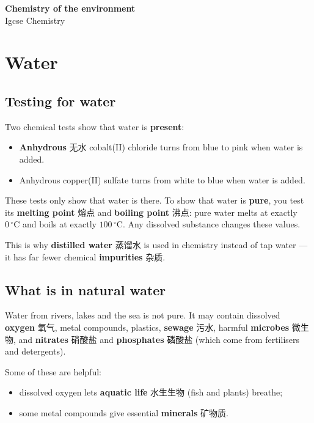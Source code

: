 \documentclass[11pt]{article}
\begin{document}
\begin{center}
  {\LARGE\bfseries Chemistry of the environment}\\[0.35em]
  {\large Igcse Chemistry}
\end{center}
\vspace{0.6em}

\section*{Water}

\subsection*{Testing for water}

Two chemical tests show that water is \textbf{present}:

\begin{itemize}
\item \textbf{Anhydrous} 无水 cobalt(II) chloride turns from blue to pink when water is added.

\item Anhydrous copper(II) sulfate turns from white to blue when water is added.

\end{itemize}

These tests only show that water is there. To show that water is \textbf{pure}, you test its \textbf{melting point} 熔点 and \textbf{boiling point} 沸点: pure water melts at exactly $0\,^{\circ}\text{C}$ and boils at exactly $100\,^{\circ}\text{C}$. Any dissolved substance changes these values.

This is why \textbf{distilled water} 蒸馏水 is used in chemistry instead of tap water — it has far fewer chemical \textbf{impurities} 杂质.

\subsection*{What is in natural water}

Water from rivers, lakes and the sea is not pure. It may contain dissolved \textbf{oxygen} 氧气, metal compounds, plastics, \textbf{sewage} 污水, harmful \textbf{microbes} 微生物, and \textbf{nitrates} 硝酸盐 and \textbf{phosphates} 磷酸盐 (which come from fertilisers and detergents).

Some of these are helpful:

\begin{itemize}
\item dissolved oxygen lets \textbf{aquatic life} 水生生物 (fish and plants) breathe;

\item some metal compounds give essential \textbf{minerals} 矿物质.

\end{itemize}
\end{document}
